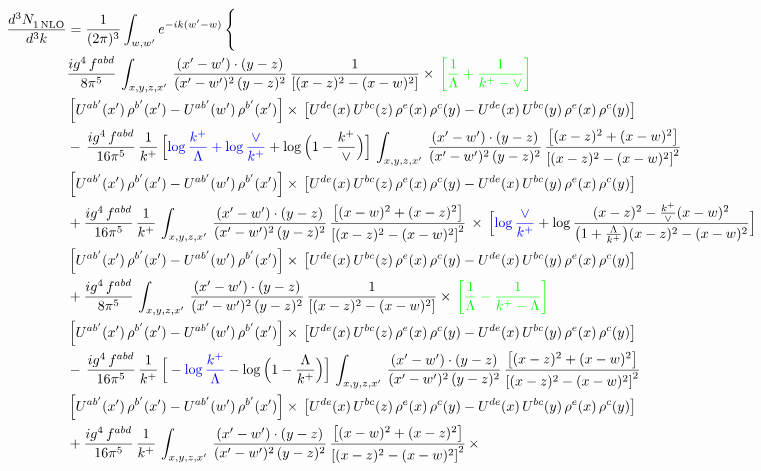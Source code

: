 \documentclass[9pt]{article}
\numberwithin{equation}{section}
\begin{document}
\begin{align}
   \frac{d^{3}N_{1\,\rm NLO}^{\rm}}{d^{3}k}  & = \frac{1}{(2\pi)^{3}}  \int_{w, w^\prime} e^{-ik(w^\prime-w)}\, \Bigg\{\notag \\ & \frac{ig^{4}\,f^{abd}}{8\pi^{5}}\,\int_{x,y,z,x'}\, \frac{(x'-w')\cdot (y-z)}{(x'-w')^{2}\,(y-z)^{2}}\, \frac{1}{\left[(x-z)^{2}-(x-w)^{2}\right]}\times\, {\color{green}\left[\frac{1}{\Lambda}+\frac{1}{k^{+}-\vee}\right]}\notag \\ & \left[U^{ab'}(x')\,\rho^{b'}(x')-U^{ab'}(w')\, \rho^{b'}(x')\right]\times\, \left[U^{de}(x)\,U^{bc}(z)\, \rho^{e}(x)\,\rho^{c}(y)-U^{de}(x)\,U^{bc}(y)\,\rho^{e}(x)\,\rho^{c}(y)\right]\notag \\ & -\,\frac{ig^{4}\,f^{abd}}{16\pi^{5}}\,\frac{1}{k^{+}}\,\Big[{\color{blue}\log\frac{k^{+}}{\Lambda}+\log\frac{\vee}{k^{+}}}+\log\Big(1-\frac{k^{+}}{\vee}\Big)\Big]\,\int_{x,y,z,x'}\, \frac{(x'-w')\cdot (y-z)}{(x'-w')^{2}\,(y-z)^{2}}\,\frac{\left[(x-z)^{2}+(x-w)^{2}\right]}{\left[(x-z)^{2}-(x-w)^{2}\right]^{2}}\notag \\ & \left[U^{ab'}(x')\,\rho^{b'}(x')-U^{ab'}(w')\, \rho^{b'}(x')\right]\times\, \left[U^{de}(x)\,U^{bc}(z)\, \rho^{e}(x)\,\rho^{c}(y)-U^{de}(x)\,U^{bc}(y)\,\rho^{e}(x)\,\rho^{c}(y)\right]\notag \\ &  +\frac{ig^{4}\,f^{abd}}{16\pi^{5}}\, \frac{1}{k^{+}}\,\int_{x,y,z,x'}\, \frac{(x'-w')\cdot (y-z)}{(x'-w')^{2}\,(y-z)^{2}}\, \frac{\left[(x-w)^{2}+(x-z)^{2}\right]}{\left[(x-z)^{2}-(x-w)^{2}\right]^{2}}\, \times\, \Big[{\color{blue}\log\frac{\vee}{k^{+}}}+\log\frac{(x-z)^{2}-\frac{k^{+}}{\vee}(x-w)^{2}}{\big(1+\frac{\Lambda}{k^{+}}\big)(x-z)^{2}-(x-w)^{2}}\Big]\notag \\ & \left[U^{ab'}(x')\,\rho^{b'}(x')-U^{ab'}(w')\, \rho^{b'}(x')\right]\times\, \left[U^{de}(x)\,U^{bc}(z)\, \rho^{e}(x)\,\rho^{c}(y)-U^{de}(x)\,U^{bc}(y)\,\rho^{e}(x)\,\rho^{c}(y)\right]\notag \\ &  + \frac{ig^{4}\,f^{abd}}{8\pi^{5}}\,\int_{x,y,z,x'}\, \frac{(x'-w')\cdot (y-z)}{(x'-w')^{2}\,(y-z)^{2}}\, \frac{1}{\left[(x-z)^{2}-(x-w)^{2}\right]}\times\, {\color{green}\left[\frac{1}{\Lambda}-\frac{1}{k^{+}-\Lambda}\right]}\notag \\ & \left[U^{ab'}(x')\,\rho^{b'}(x')-U^{ab'}(w')\, \rho^{b'}(x')\right]\times\, \left[U^{de}(x)\,U^{bc}(z)\, \rho^{e}(x)\,\rho^{c}(y)-U^{de}(x)\,U^{bc}(y)\,\rho^{e}(x)\,\rho^{c}(y)\right]\notag \\ & -\,\frac{ig^{4}\,f^{abd}}{16\pi^{5}}\,\frac{1}{k^{+}}\,\Big[-{\color{blue}\log\frac{k^{+}}{\Lambda}}-\log\Big(1-\frac{\Lambda}{k^{+}}\Big)\Big]\,\int_{x,y,z,x'}\, \frac{(x'-w')\cdot (y-z)}{(x'-w')^{2}\,(y-z)^{2}}\,\frac{\left[(x-z)^{2}+(x-w)^{2}\right]}{\left[(x-z)^{2}-(x-w)^{2}\right]^{2}}\notag \\ & \left[U^{ab'}(x')\,\rho^{b'}(x')-U^{ab'}(w')\, \rho^{b'}(x')\right]\times\, \left[U^{de}(x)\,U^{bc}(z)\, \rho^{e}(x)\,\rho^{c}(y)-U^{de}(x)\,U^{bc}(y)\,\rho^{e}(x)\,\rho^{c}(y)\right]\notag \\ & +\frac{ig^{4}\,f^{abd}}{16\pi^{5}}\, \frac{1}{k^{+}}\,\int_{x,y,z,x'}\, \frac{(x'-w')\cdot (y-z)}{(x'-w')^{2}\,(y-z)^{2}}\, \frac{\left[(x-w)^{2}+(x-z)^{2}\right]}{\left[(x-z)^{2}-(x-w)^{2}\right]^{2}}\, \times\, 
\end{align}
\end{document}
